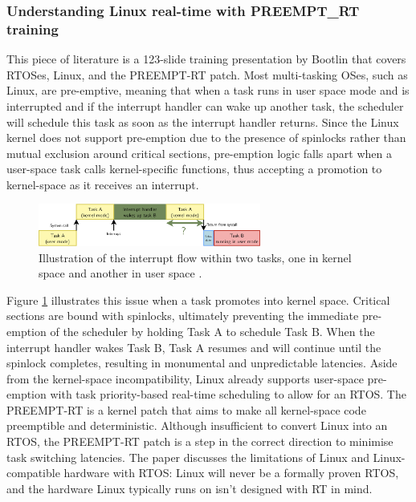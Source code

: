 \subsubsection{Understanding Linux real-time with PREEMPT\_RT training \cite{bootlinUnderstandingLinuxRealtime2024}}
This piece of literature is a 123-slide training presentation by Bootlin that covers RTOSes, Linux, and the PREEMPT-RT patch. Most multi-tasking OSes, such as Linux, are pre-emptive, meaning that when a task runs in user space mode and is interrupted and if the interrupt handler can wake up another task, the scheduler will schedule this task as soon as the interrupt handler returns. Since the Linux kernel does not support pre-emption due to the presence of spinlocks rather than mutual exclusion around critical sections, pre-emption logic falls apart when a user-space task calls kernel-specific functions, thus accepting a promotion to kernel-space as it receives an interrupt.

\begin{figure}[h]
    \centering
    \includegraphics[width=0.65\textwidth]{assets/bootlin-interrupt-flow.png}
    \caption{Illustration of the interrupt flow within two tasks, one in kernel space and another in user space \cite{bootlinUnderstandingLinuxRealtime2024}.}
    \label{fig:bootlin_flow}
\end{figure}

Figure \ref{fig:bootlin_flow} illustrates this issue when a task promotes into kernel space. Critical sections are bound with spinlocks, ultimately preventing the immediate pre-emption of the scheduler by holding Task A to schedule Task B. When the interrupt handler wakes Task B, Task A resumes and will continue until the spinlock completes, resulting in monumental and unpredictable latencies. Aside from the kernel-space incompatibility, Linux already supports user-space pre-emption with task priority-based real-time scheduling to allow for an RTOS. The PREEMPT-RT is a kernel patch that aims to make all kernel-space code preemptible and deterministic. Although insufficient to convert Linux into an RTOS, the PREEMPT-RT patch is a step in the correct direction to minimise task switching latencies. The paper discusses the limitations of Linux and Linux-compatible hardware with RTOS: Linux will never be a formally proven RTOS, and the hardware Linux typically runs on isn't designed with RT in mind.

